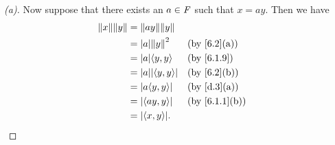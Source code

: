 \begin{proof}[(a)]
  Now suppose that there exists an \(a \in \mathit{F}\) such that \(x = ay\).
  Then we have
  \begin{align*}
    \norm{x} \norm{y} & = \norm{ay} \norm{y}                          \\
                      & = \abs{a} \norm{y}^2       &  & \by{6.2}[a]   \\
                      & = \abs{a} \inn{y, y}       &  & \by{6.1.9}    \\
                      & = \abs{a} \abs{\inn{y, y}} &  & \by{6.2}[b]   \\
                      & = \abs{a \inn{y, y}}       &  & \by{d.3}[a]   \\
                      & = \abs{\inn{ay, y}}        &  & \by{6.1.1}[b] \\
                      & = \abs{\inn{x, y}}.
  \end{align*}
\end{proof}

